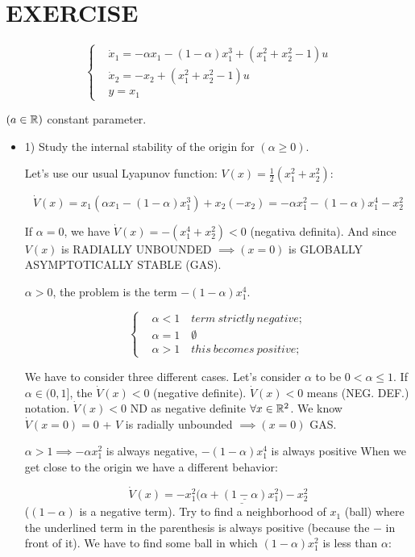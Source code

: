\section{EXERCISE}

\[
	\left\{
	\begin{aligned}
	&\dot{x}_1 = -\alpha x_1 - (1-\alpha)x_1^3 + (x_1^2+x_2^2-1)u\\
	&\dot{x}_2 = -x_2 + (x_1^2 + x_2^2-1)u\\
	&y = x_1
	\end{aligned}
	\right.
\]

$(a\in\mathbb{R})$ constant parameter.

\begin{itemize}
\item{1)} Study the internal stability of the origin for $(\alpha\geq 0)$.

Let's use our usual Lyapunov function: $V(x) = \frac{1}{2}(x_1^2+x_2^2)$:

\[
	\dot{V}(x) = x_1(\alpha x_1 -(1-\alpha)x_1^3) +x_2(-x_2) = -\alpha x_1^2 - (1-\alpha)x_1^4 - x_2^2
\]

If $\alpha = 0$, we have $\dot{V}(x) = -(x_1^4+x_2^2) < 0$ (negativa definita). And since $V(x)$ is RADIALLY UNBOUNDED $\implies (x=0)$ is GLOBALLY ASYMPTOTICALLY STABLE (GAS).

$\alpha>0$, the problem is the term $-(1-\alpha)x_1^4$.

\[
	\left\{
	\begin{aligned}
	&\alpha<1\quad term\ strictly\ negative;\\
	&\alpha=1\quad \emptyset\\
	&\alpha>1\quad this\ becomes\ positive;
	\end{aligned}
	\right.
\]

We have to consider three different cases. Let's consider $\alpha$ to be $0<\alpha\leq 1$. If $\alpha\in(0,1]$, the $\dot{V}(x)<0$ (negative definite). $\dot{V}(x) <0$ means (NEG. DEF.) notation. $\dot{V}(x)<0$ ND as negative definite $\forall x\in\mathbb{R}^2$. We know $\dot{V}(x=0) = 0$ + $V$ is radially unbounded $\implies (x=0)$ GAS.

$\alpha>1 \implies -\alpha x_1^2$ is always negative, $-(1-\alpha)x_1^4$ is always positive When we get close to the origin we have a different behavior:

\[
	\dot{V}(x) = -x_1^2(\underline{\alpha +(\underline{1-\alpha})x_1^2)} - x_2^2
\]
($(1-\alpha)$ is a negative term). Try to find a neighborhood of $x_1$ (ball) where the underlined term in the parenthesis is always positive (because the $-$ in front of it).
We have to find some ball in which $(1-\alpha)x_1^2$ is less than $\alpha$:


\end{itemize}
